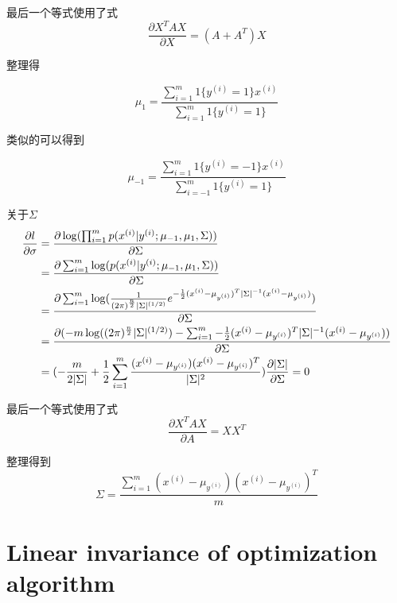 \documentclass{ctexart}
\begin{document}
最后一个等式使用了式
\begin{equation*}
\frac{\partial X^TAX}{\partial X} = (A + A^T)X
\end{equation*}

整理得

\begin{equation}
 	\mu_{1} = \frac{\sum_{i=1}^m 1\{y^{(i)} = 1\} x^{(i)}}{\sum_{i=1}^m 1\{y^{(i)} = 1\}}
\end{equation}

类似的可以得到

\begin{equation}
\mu_{-1} = \frac{\sum_{i=1}^m 1\{y^{(i)} = -1\} x^{(i)}}{\sum_{i=-1}^m 1\{y^{(i)} = 1\}}
\end{equation}

关于$\Sigma$
\begin{align*}
\frac{\partial l}{\partial \sigma} &= \frac{\partial \log(\prod_{i=1}^m p(x^{(i)}|y^{(i)};\mu_{-1},\mu_1,\Sigma))}{\partial \Sigma} \notag \\
&=  \frac{\partial \sum_{i=1}^m\log( p(x^{(i)}|y^{(i)};\mu_{-1},\mu_1,\Sigma))}{\partial \Sigma} \notag \\
&=  \frac{\partial \sum_{i=1}^m\log(\frac{1}{(2\pi)^{\frac{n}{2}}|\Sigma|^{(1/2)}}e^{-\frac{1}{2}(x^{(i)}-\mu_{y^{(i)}})^T |\Sigma|^{-1} (x^{(i)}-\mu_{y^{(i)}})})}{\partial \Sigma} \notag \\
&=  \frac{ \partial (-m\log((2\pi)^{\frac{n}{2}}|\Sigma|^{(1/2)}) -\sum_{i=1}^m -\frac{1}{2}(x^{(i)}-\mu_{y^{(i)}})^T |\Sigma|^{-1} (x^{(i)}-\mu_{y^{(i)}}))}{\partial \Sigma} \notag \\
&= (-\frac{m}{2|\Sigma|} + \frac{1}{2}\sum_{i=1}^m\frac{(x^{(i)} -\mu_{y^{(i)}})(x^{(i)} -\mu_{y^{(i)}})^T}{|\Sigma|^2})\frac{\partial |\Sigma|}{\partial \Sigma} = 0
\end{align*}

最后一个等式使用了式
\begin{equation*}
	\frac{\partial X^TAX}{\partial A} = XX^T
\end{equation*}

整理得到
\begin{equation}
\Sigma = \frac{\sum_{i=1}^m(x^{(i)} - \mu_{y^{(i)}})(x^{(i)} - \mu_{y^{(i)}})^T}{m}
\end{equation}

\section{Linear invariance of optimization algorithm}
\end{document}

